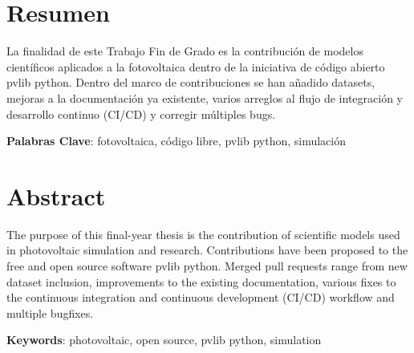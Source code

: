 \chapter*{Resumen} \label{chp:abstract}

La finalidad de este Trabajo Fin de Grado es la contribución de modelos científicos aplicados a la fotovoltaica dentro de la iniciativa de código abierto pvlib python. Dentro del marco de contribuciones se han añadido datasets, mejoras a la documentación ya existente, varios arreglos al flujo de integración y desarrollo continuo (CI/CD) y corregir múltiples bugs.

\textbf{Palabras Clave}: fotovoltaica, código libre, pvlib python, simulación


\newpage


\chapter*{Abstract}

The purpose of this final-year thesis is the contribution of scientific models used in photovoltaic simulation and research. Contributions have been proposed to the free and open source software pvlib python. Merged pull requests range from new dataset inclusion, improvements to the existing documentation, various fixes to the continuous integration and continuous development (CI/CD) workflow and multiple bugfixes.

\textbf{Keywords}: photovoltaic, open source, pvlib python, simulation